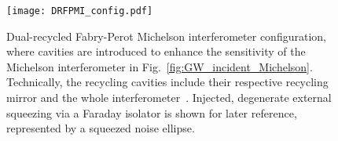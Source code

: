 

\begin{figure}
	\centering
	\texttt{[image: DRFPMI\_config.pdf]}
	\caption{Dual-recycled Fabry-Perot Michelson interferometer configuration, where cavities are introduced to enhance the sensitivity of the Michelson interferometer in Fig.~\ref{fig:GW_incident_Michelson}. Technically, the recycling cavities include their respective recycling mirror and the whole interferometer~\cite{meersRecyclingLaserinterferometricGravitationalwave1988,1995AuJPh..48..953M}. Injected, degenerate external squeezing via a Faraday isolator is shown for later reference, represented by a squeezed noise ellipse.}
	\label{fig:DRFPMI}
\end{figure}


